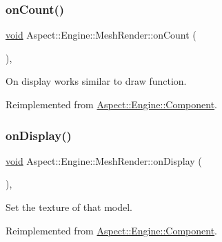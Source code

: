 \subsubsection{\texorpdfstring{on\+Count()}{onCount()}}
{\footnotesize\ttfamily \mbox{\hyperlink{_s_d_l__opengles2__gl2ext_8h_ae5d8fa23ad07c48bb609509eae494c95}{void}} Aspect\+::\+Engine\+::\+Mesh\+Render\+::on\+Count (\begin{DoxyParamCaption}{ }\end{DoxyParamCaption})\hspace{0.3cm}{\ttfamily [private]}, {\ttfamily [virtual]}}



On display works similar to draw function. 



Reimplemented from \mbox{\hyperlink{class_aspect_1_1_engine_1_1_component_a02de673a0591459bd0d39e3022c1d3fc}{Aspect\+::\+Engine\+::\+Component}}.

\mbox{\label{class_aspect_1_1_engine_1_1_mesh_render_aed81ecbd6bf1d63acb06171f729e4927}} 
\subsubsection{\texorpdfstring{on\+Display()}{onDisplay()}}
{\footnotesize\ttfamily \mbox{\hyperlink{_s_d_l__opengles2__gl2ext_8h_ae5d8fa23ad07c48bb609509eae494c95}{void}} Aspect\+::\+Engine\+::\+Mesh\+Render\+::on\+Display (\begin{DoxyParamCaption}{ }\end{DoxyParamCaption})\hspace{0.3cm}{\ttfamily [private]}, {\ttfamily [virtual]}}



Set the texture of that model. 



Reimplemented from \mbox{\hyperlink{class_aspect_1_1_engine_1_1_component_ac67307dba854cdc9535a0de75e5a3d09}{Aspect\+::\+Engine\+::\+Component}}.

\mbox{\label{class_aspect_1_1_engine_1_1_mesh_render_a54bb4394dafdc30e919a0ba5d9854871}} 
